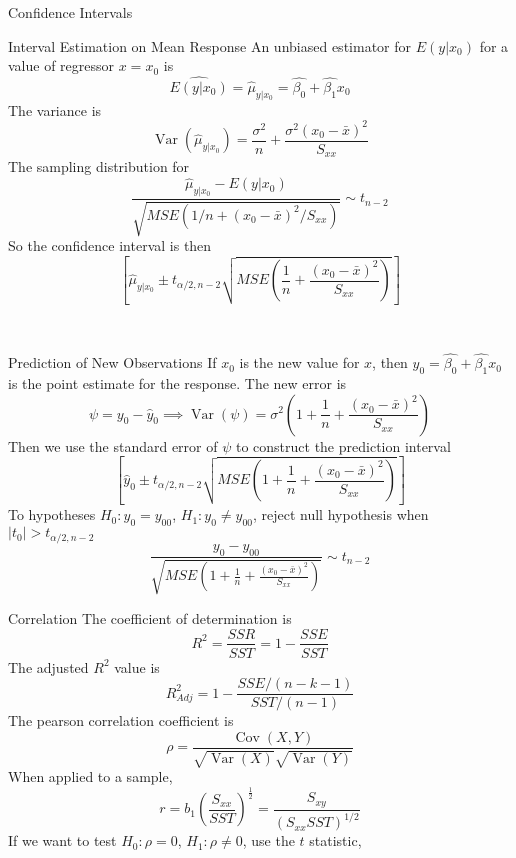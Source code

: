 \documentclass{article}
\DeclareMathOperator{\Var}{Var}
\DeclareMathOperator{\Cov}{Cov}
\begin{document}
\begin{multicols*}{3}
\begin{blackbox}{Confidence Intervals}
        \begin{brownbox}{Interval Estimation on Mean Response}
            An unbiased estimator for $E(y|x_0)$ for a value of regressor $x=x_0$ is 
            \[\widehat{E(y|x_0)} = \hat{\mu}_{y|x_0} = \hat{\beta_0} + \hat{\beta_1}x_0\]
            The variance is 
            \[\Var(\hat{\mu}_{y|x_0}) = \frac{\sigma^2}{n} + \frac{\sigma^2(x_0-\bar{x})^2}{S_{xx}}\]
            The sampling distribution for 
            \[\frac{\hat{\mu}_{y|x_0} - E(y|x_0)}{\sqrt{MSE(1/n + (x_0-\bar{x})^2/S_{xx})}} \sim t_{n-2}\]
            So the confidence interval is then 
            \[\left[\hat{\mu}_{y|x_0} \pm t_{\alpha/2, n-2}\sqrt{MSE\left(\frac{1}{n} + \frac{(x_0 - \bar{x})^2}{S_{xx}}\right)} \right]\]
        \end{brownbox}\\[-2ex]
    \end{blackbox}
    \begin{blackbox}{Prediction of New Observations}
        If $x_0$ is the new value for $x$, then $\hat{y}_0 = \hat{\beta_0} + \hat{\beta_1}x_0$ is the point estimate for the response. The new error is \\[-4ex]
        \[\psi = y_0 - \hat{y}_0 \implies \Var(\psi) = \sigma^2\left(1+\frac{1}{n} + \frac{(x_0-\bar{x})^2}{S_{xx}}\right)\]
        Then we use the standard error of $\psi$ to construct the prediction interval 
        \[\left[\hat{y}_0 \pm t_{\alpha/2, n-2} \sqrt{MSE\left(1+\frac{1}{n} + \frac{(x_0-\bar{x})^2}{S_{xx}}\right)}\right]\]
        To hypotheses $H_0: y_0 = y_{00}$, $H_1: y_0 \neq y_{00}$, reject null hypothesis when $|t_0| > t_{\alpha/2, n-2}$
        \[\frac{y_0 - y_{00}}{\sqrt{MSE\left(1+\frac{1}{n} + \frac{(x_0-\bar{x})^2}{S_{xx}}\right)}} \sim  t_{n-2}\]
    \end{blackbox}
    \begin{blackbox}{Correlation}
        The coefficient of determination is \\[-2ex]
        \[R^2 = \frac{SSR}{SST} = 1 - \frac{SSE}{SST}\]
        The adjusted $R^2$ value is \\[-2ex]
        \[R^2_{Adj} = 1 - \frac{SSE/(n-k-1)}{SST/(n-1)}\]
        The pearson correlation coefficient is \\[-2ex]
        \[\rho = \frac{\Cov(X,Y)}{\sqrt{\Var(X)}\sqrt{\Var(Y)}}\]
        When applied to a sample, \\[-3ex]
        \[
            r = b_1\left(\frac{S_{xx}}{SST}\right)^{\frac{1}{2}} = \frac{S_{xy}}{(S_{xx}SST)^{1/2}}  
        \]
        If we want to test $H_0: \rho = 0$, $H_1: \rho \neq 0$, use the $t$ statistic,\\[-3ex]

\end{blackbox}
\end{multicols*}
\end{document}
